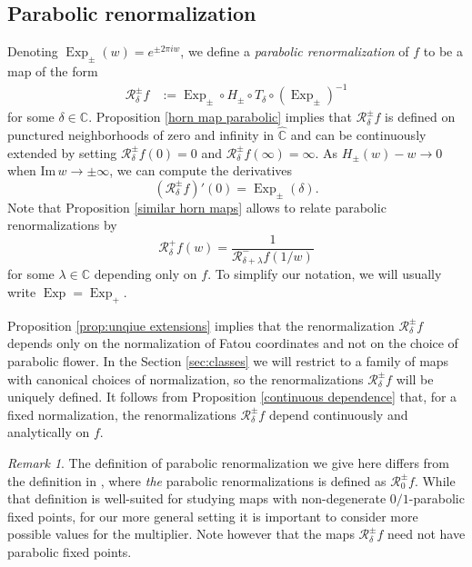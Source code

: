 \documentclass[12pt,letterpaper]{amsart}
\numberwithin{equation}{section}
\theoremstyle{remark}
\newtheorem{remark}[equation]{Remark}
\theoremstyle{definition}
\newcommand{\C}{\mathbb C}
\newcommand{\RR}{\mathcal R}
\DeclareMathOperator{\Exp}{Exp}
\begin{document}
	
	
	
	
	
	\subsection{Parabolic renormalization}
	Denoting  $\Exp_\pm(w) = e^{\pm 2\pi i w}$, we define a \textit{parabolic renormalization} of $f$  to be a map of the form
	\begin{align*}
		\mathcal{R}_{\delta}^\pm f&:= \Exp_\pm\circ  H_{\pm }\circ T_{\delta}\circ(\Exp_\pm)^{-1}
	\end{align*}
	for some $\delta\in \mathbb{C}$.
	Proposition \ref{horn map parabolic} implies that 
	$\mathcal{R}_{\delta}^\pm f$ is defined on punctured neighborhoods of zero and infinity in $\hat{\mathbb{C}}$ and can be continuously extended by setting
	$\mathcal{R}_\delta^\pm f(0) = 0$ and $\mathcal{R}_\delta^\pm f(\infty) = \infty.$ 
	As $H_\pm(w) -w\to 0$ when $\text{Im}\,w\to \pm \infty$,
	we can compute the derivatives $$(\mathcal{R}_\delta^\pm f)'(0) = \Exp_\pm(\delta).$$
	Note that Proposition \ref{similar horn maps} allows to relate parabolic renormalizations by 
	$$\RR_{\delta}^+f(w) = \frac{1}{\RR_{\delta+\lambda}^-f(1/w)}$$
	for some $\lambda\in \C$ depending only on $f$.
	 To simplify our notation, we will usually write $\Exp = \Exp_+$.
	
	Proposition \ref{prop:unqiue extensions} implies that the renormalization $\RR_\delta^\pm f$ 
	depends only on the normalization of Fatou coordinates and not on the choice of parabolic flower. 
	In the Section \ref{sec:classes}  we will restrict to a family of maps with  canonical choices of normalization, so the renormalizations $\RR_\delta^\pm f$ will be uniquely defined.	
	It  follows from Proposition \ref{continuous dependence} that, for a fixed normalization, the renormalizations $\RR_\delta^\pm f$ depend continuously and analytically on $f$.
	
	\begin{remark}
		The definition of parabolic renormalization we give here differs from the definition in  \cite{shishikura}, where \textit{the} parabolic renormalizations is defined as $\mathcal{R}_0^\pm f$. While that definition is well-suited for studying maps with non-degenerate $0/1$-parabolic fixed points, for our more general setting it is important to consider more possible values for the multiplier. Note however that the maps $\RR_\delta^\pm f$ need not have parabolic fixed points.
	\end{remark}
	
\end{document}
